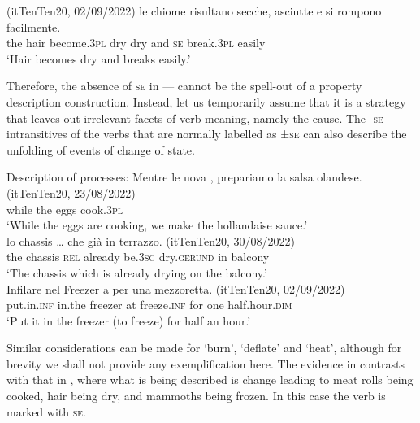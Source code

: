 \documentclass[output=paper,colorlinks,citecolor=brown
]{langscibook}
\begin{document}
\hspace*{\fill}(itTenTen20, 02/09/2022)\quad
\ea \label{bentley_example_23}
    \gll  {\ldots}  le		chiome risultano				secche,	asciutte e				si 		rompono facilmente.\\
    {} the	hair				become.3\textsc{pl}	dry					dry					and	\textsc{se}		break.3\textsc{pl}	easily \\
    \glt ‘Hair becomes dry and breaks easily.’ 
\z

Therefore, the absence of \textsc{se} in — cannot be the spell-out of a property description construction. Instead, let us temporarily assume that it is a strategy that leaves out irrelevant facets of verb meaning, namely the cause. 
The -\textsc{se} intransitives of the verbs that are normally labelled as ±\textsc{se} can also describe the unfolding of events of change of state. 

\ea \label{bentley_example_24}
    Description of processes:
    \ea \label{bentley_example_24a}
    \gll Mentre	le			uova	, { prepariamo la salsa olandese. (itTenTen20, 23/08/2022)} \\
    while			the		eggs		cook.3\textsc{pl} {} \\
    \glt ‘While the eggs are cooking, we make the hollandaise sauce.’ \\
    \ex \label{bentley_example_24b}
    \gll  {\ldots}  lo chassis  {\ldots}  che		già 				 				in 	terrazzo. {(itTenTen20, 30/08/2022)}\\
    {} the	chassis	 {}				\textsc{rel}	already	be.3\textsc{sg}	dry.\textsc{gerund}	in		balcony	{} \\
    \glt 	‘The chassis which is already drying on the balcony.’ \\
    \ex \label{bentley_example_24c}
    \gll Infilare			nel			Freezer	a				per 	una	mezzoretta. {(itTenTen20, 02/09/2022)}\\
    put.in.\textsc{inf}		in.the	freezer		at	freeze.\textsc{inf}	for		one	half.hour.\textsc{dim}	{} \\
    \glt 					‘Put it in the freezer (to freeze) for half an hour.’ \\
    \z
\z

Similar considerations can be made for  ‘burn’,  ‘deflate’ and  ‘heat’, although for brevity we shall not provide any exemplification here. 
The evidence in  contrasts with that in , where what is being described is change leading to meat rolls being cooked, hair being dry, and mammoths being frozen. In this case the verb is marked with \textsc{se}.
\end{document}
